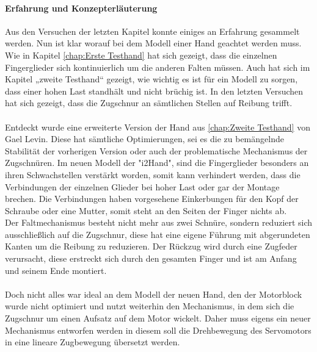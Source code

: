 \documentclass[titlepage,12pt,twoside]{article}
\begin{document}
\paragraph{Erfahrung und Konzepterläuterung}
\hfill \break
\hfill \break
Aus den Versuchen der letzten Kapitel konnte einiges an Erfahrung gesammelt werden. Nun ist klar worauf bei dem Modell einer Hand geachtet werden muss. \\
Wie in Kapitel \autoref{chap:Erste Testhand} hat sich gezeigt, dass die einzelnen Fingerglieder sich kontinuierlich um die anderen Falten müssen. Auch hat sich im Kapitel „zweite Testhand“ gezeigt, wie wichtig es ist für ein Modell zu sorgen, dass einer hohen 
Last standhält und nicht brüchig ist. In den letzten Versuchen hat sich gezeigt, dass die Zugschnur an sämtlichen Stellen auf Reibung trifft. \\
\\
Entdeckt wurde eine erweiterte Version der Hand aus \autoref{chap:Zweite Testhand} von Gael Levin. Diese hat sämtliche Optimierungen, sei es die zu bemängelnde Stabilität der vorherigen Version oder auch der problematische Mechanismus der 
Zugschnüren. Im neuen Modell der "i2Hand", sind die Fingerglieder besonders an ihren Schwachstellen verstärkt worden, somit kann verhindert werden, dass die Verbindungen der einzelnen Glieder bei hoher Last oder gar der Montage brechen. Die 
Verbindungen haben vorgesehene Einkerbungen für den Kopf der Schraube oder eine Mutter, somit steht an den Seiten der Finger nichts ab. \\
Der Faltmechanismus besteht nicht mehr aus zwei Schnüre, sondern reduziert sich ausschließlich auf die Zugschnur, diese hat eine eigene Führung mit abgerundeten Kanten um die Reibung zu reduzieren. Der Rückzug wird durch eine Zugfeder verursacht, 
diese erstreckt sich durch den gesamten Finger und ist am Anfang und seinem Ende montiert. \\
\\
Doch nicht alles war ideal an dem Modell der neuen Hand, den der Motorblock wurde nicht optimiert und nutzt weiterhin den Mechanismus, in dem sich die Zugschnur um einen Aufsatz auf dem Motor wickelt. Daher muss eigens ein neuer Mechanismus 
entworfen werden in diesem soll die Drehbewegung des Servomotors in eine lineare Zugbewegung übersetzt werden. \\
\\
\end{document}
